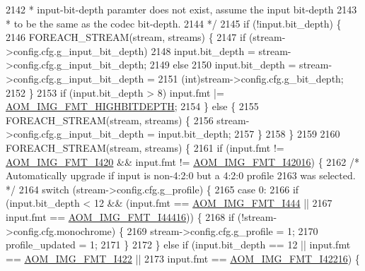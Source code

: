 \begin{DoxyCodeInclude}
{{{{{{{{{{{{{{{{{{{{{{{{{{{{{{{{{{{{{{{{{{{{{{{{{{{2142 \textcolor{comment}{     * input-bit-depth paramter does not exist, assume the input bit-depth}
2143 \textcolor{comment}{     * to be the same as the codec bit-depth.}
2144 \textcolor{comment}{     */}
2145     \textcolor{keywordflow}{if} (!input.bit\_depth) \{
2146       FOREACH\_STREAM(stream, streams) \{
2147         \textcolor{keywordflow}{if} (stream->config.cfg.g\_input\_bit\_depth)
2148           input.bit\_depth = stream->config.cfg.g\_input\_bit\_depth;
2149         \textcolor{keywordflow}{else}
2150           input.bit\_depth = stream->config.cfg.g\_input\_bit\_depth =
2151               (int)stream->config.cfg.g\_bit\_depth;
2152       \}
2153       \textcolor{keywordflow}{if} (input.bit\_depth > 8) input.fmt |= \hyperlink{aom__image_8h_a607b37d91f75442f54223ecd85f1b6cb}{AOM\_IMG\_FMT\_HIGHBITDEPTH};
2154     \} \textcolor{keywordflow}{else} \{
2155       FOREACH\_STREAM(stream, streams) \{
2156         stream->config.cfg.g\_input\_bit\_depth = input.bit\_depth;
2157       \}
2158     \}
2159 
2160     FOREACH\_STREAM(stream, streams) \{
2161       \textcolor{keywordflow}{if} (input.fmt != \hyperlink{aom__image_8h_a930317c04b4bd0a660bb5e744055523cabd778a3d697463e89d12a1117f417b60}{AOM\_IMG\_FMT\_I420} && input.fmt != 
      \hyperlink{aom__image_8h_a930317c04b4bd0a660bb5e744055523ca20a9cf30277260685642b4cfb4e9273b}{AOM\_IMG\_FMT\_I42016}) \{
2162         \textcolor{comment}{/* Automatically upgrade if input is non-4:2:0 but a 4:2:0 profile}
2163 \textcolor{comment}{           was selected. */}
2164         \textcolor{keywordflow}{switch} (stream->config.cfg.g\_profile) \{
2165           \textcolor{keywordflow}{case} 0:
2166             \textcolor{keywordflow}{if} (input.bit\_depth < 12 && (input.fmt == \hyperlink{aom__image_8h_a930317c04b4bd0a660bb5e744055523ca89d423506e948ab7d3b98b5750b92655}{AOM\_IMG\_FMT\_I444} ||
2167                                          input.fmt == \hyperlink{aom__image_8h_a930317c04b4bd0a660bb5e744055523cab9b93d397dedbdd6bfafec84d1f8f0f5}{AOM\_IMG\_FMT\_I44416})) \{
2168               \textcolor{keywordflow}{if} (!stream->config.cfg.monochrome) \{
2169                 stream->config.cfg.g\_profile = 1;
2170                 profile\_updated = 1;
2171               \}
2172             \} \textcolor{keywordflow}{else} \textcolor{keywordflow}{if} (input.bit\_depth == 12 || input.fmt == \hyperlink{aom__image_8h_a930317c04b4bd0a660bb5e744055523cab2f75281e94ebc0f0bc728ef287cd3e8}{AOM\_IMG\_FMT\_I422} ||
2173                        input.fmt == \hyperlink{aom__image_8h_a930317c04b4bd0a660bb5e744055523ca064683ed4260fc6244af6cfc9d261c22}{AOM\_IMG\_FMT\_I42216}) \{
}}}}}}}}}}}}}}}}}}}}}}}}}}}}}}}}}}}}}}}}}}}}}}}}}}}
\end{DoxyCodeInclude}
